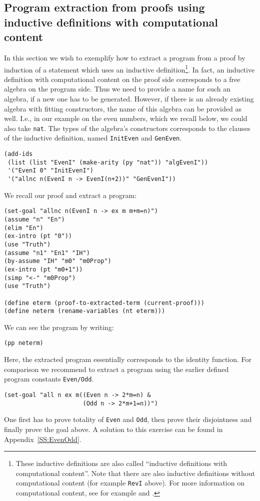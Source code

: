 \documentclass[12pt]{amsart}
\newcommand{\inquotes}[1]{``#1''}
\begin{document}
\subsection{Program extraction from proofs using inductive
  definitions with computational content} In this section we wish to
exemplify how to extract a program from a proof by induction of a
statement which uses an inductive definition\footnote{These inductive
  definitions are also called \inquotes{inductive definitions with
    computational content}. Note that there are also inductive
  definitions without computational content (for example \texttt{RevI}
  above).  For more information on computational content, see for
  example \cite{SchwichtenbergWainer12} and
  \cite{BergerSeisenberger10}.}.  In fact, an inductive definition
with computational content on the proof side corresponds to a free
algebra on the program side.  Thus we need to provide a name for such
an algebra, if a new one has to be generated.  However, if there is an
already existing algebra with fitting constructors, the name of this
algebra can be provided as well.  I.e., in our example on the even
numbers, which we recall below, we could also take \texttt{nat}.  The
types of the algebra's constructors corresponds to the clauses of the
inductive definition, named \texttt{InitEven} and \texttt{GenEven}.
\begin{verbatim}
(add-ids
 (list (list "EvenI" (make-arity (py "nat")) "algEvenI"))
 '("EvenI 0" "InitEvenI")
 '("allnc n(EvenI n -> EvenI(n+2))" "GenEvenI"))
\end{verbatim}
We recall our proof and extract a program:
\begin{verbatim}
(set-goal "allnc n(EvenI n -> ex m m+m=n)")
(assume "n" "En")
(elim "En")
(ex-intro (pt "0"))
(use "Truth")
(assume "n1" "En1" "IH")
(by-assume "IH" "m0" "m0Prop")
(ex-intro (pt "m0+1"))
(simp "<-" "m0Prop")
(use "Truth")

(define eterm (proof-to-extracted-term (current-proof)))
(define neterm (rename-variables (nt eterm)))
\end{verbatim}
We can see the program by writing:
\begin{verbatim}
(pp neterm)
\end{verbatim}
Here, the extracted program essentially corresponds to the identity
function.  For comparison we recommend to extract a program using the
earlier defined program constants \verb|Even/Odd|.
\begin{verbatim}
(set-goal "all n ex m((Even n -> 2*m=n) &
                      (Odd n -> 2*m+1=n))")
\end{verbatim}
One first has to prove totality of \verb|Even| and \verb|Odd|, then
prove their disjointness and finally prove the goal above.  A solution
to this exercise can be found in Appendix~\ref{SS:EvenOdd}.
\end{document}
